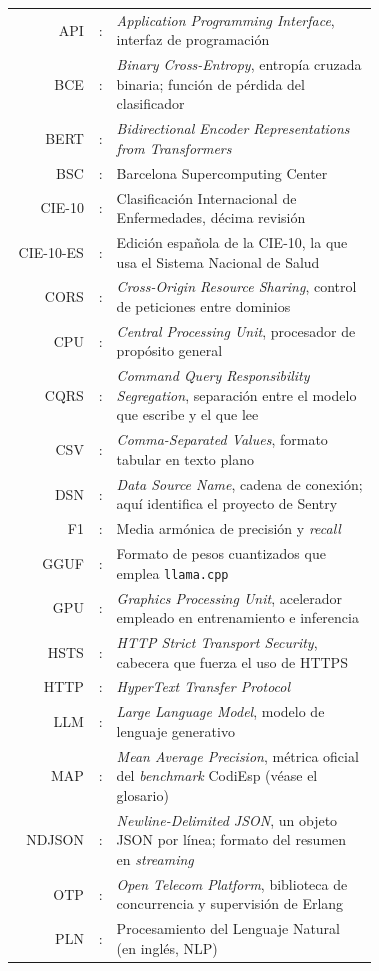 \begin{longtable}{r r p{0.72\linewidth}}
API   & : & \emph{Application Programming Interface}, interfaz de programación \\
BCE   & : & \emph{Binary Cross-Entropy}, entropía cruzada binaria; función de pérdida del clasificador \\
BERT  & : & \emph{Bidirectional Encoder Representations from Transformers} \\
BSC   & : & Barcelona Supercomputing Center \\
CIE-10 & : & Clasificación Internacional de Enfermedades, décima revisión \\
CIE-10-ES & : & Edición española de la CIE-10, la que usa el Sistema Nacional de Salud \\
CORS  & : & \emph{Cross-Origin Resource Sharing}, control de peticiones entre dominios \\
CPU   & : & \emph{Central Processing Unit}, procesador de propósito general \\
CQRS  & : & \emph{Command Query Responsibility Segregation}, separación entre el modelo que escribe y el que lee \\
CSV   & : & \emph{Comma-Separated Values}, formato tabular en texto plano \\
DSN   & : & \emph{Data Source Name}, cadena de conexión; aquí identifica el proyecto de Sentry \\
F1    & : & Media armónica de precisión y \emph{recall} \\
GGUF  & : & Formato de pesos cuantizados que emplea \texttt{llama.cpp} \\
GPU   & : & \emph{Graphics Processing Unit}, acelerador empleado en entrenamiento e inferencia \\
HSTS  & : & \emph{HTTP Strict Transport Security}, cabecera que fuerza el uso de HTTPS \\
HTTP  & : & \emph{HyperText Transfer Protocol} \\
LLM   & : & \emph{Large Language Model}, modelo de lenguaje generativo \\
MAP   & : & \emph{Mean Average Precision}, métrica oficial del \emph{benchmark} CodiEsp (véase el glosario) \\
NDJSON & : & \emph{Newline-Delimited JSON}, un objeto JSON por línea; formato del resumen en \emph{streaming} \\
OTP   & : & \emph{Open Telecom Platform}, biblioteca de concurrencia y supervisión de Erlang \\
PLN   & : & Procesamiento del Lenguaje Natural (en inglés, NLP) \\

\end{longtable}
